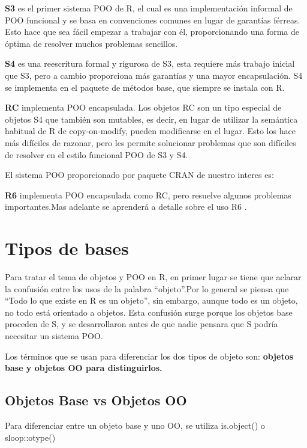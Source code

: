 \documentclass[
]{book}
\begin{document}
\textbf{S3} es el primer sistema POO de R, el cual es una implementación informal de POO funcional y se basa en convenciones comunes en lugar de garantías férreas. Esto hace que sea fácil empezar a trabajar con él, proporcionando una forma de óptima de resolver muchos problemas sencillos.

\textbf{S4} es una reescritura formal y rigurosa de S3, esta requiere más trabajo inicial que S3, pero a cambio proporciona más garantías y una mayor encapsulación. S4 se implementa en el paquete de métodos base, que siempre se instala con R.

\textbf{RC} implementa POO encapsulada. Los objetos RC son un tipo especial de objetos S4 que también son mutables, es decir, en lugar de utilizar la semántica habitual de R de copy-on-modify, pueden modificarse en el lugar. Esto los hace más difíciles de razonar, pero les permite solucionar problemas que son difíciles de resolver en el estilo funcional POO de S3 y S4.

El sistema POO proporcionado por paquete CRAN de nuestro interes es:

\textbf{R6} implementa POO encapsulada como RC, pero resuelve algunos problemas importantes.Mas adelante se aprenderá a detalle sobre el uso R6 .

\hypertarget{tipos-de-bases}{%
\section{Tipos de bases}\label{tipos-de-bases}}

Para tratar el tema de objetos y POO en R, en primer lugar se tiene que aclarar la confusión entre los usos de la palabra ``objeto''.Por lo general se piensa que ``Todo lo que existe en R es un objeto'', sin embargo, aunque todo es un objeto, no todo está orientado a objetos. Esta confusión surge porque los objetos base proceden de S, y se desarrollaron antes de que nadie pensara que S podría necesitar un sistema POO.

Los términos que se usan para diferenciar los dos tipos de objeto son: \textbf{objetos base y objetos OO para distinguirlos.}

\hypertarget{objetos-base-vs-objetos-oo}{%
\subsection{Objetos Base vs Objetos OO}\label{objetos-base-vs-objetos-oo}}

Para diferenciar entre un objeto base y uno OO, se utiliza is.object() o sloop::otype()
\end{document}
